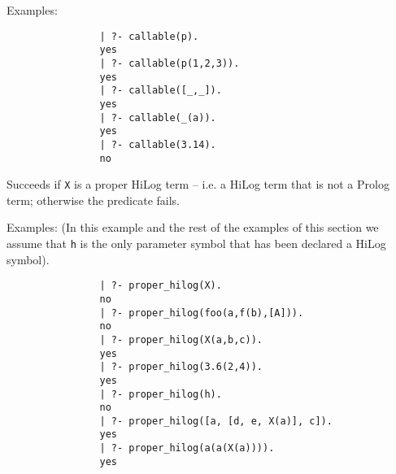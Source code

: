 \begin{description}
    Examples:
    {\footnotesize
     \begin{verbatim}
                | ?- callable(p).
                yes
                | ?- callable(p(1,2,3)).
                yes
                | ?- callable([_,_]).
                yes
                | ?- callable(_(a)).
                yes
                | ?- callable(3.14).
                no
     \end{verbatim}}

%
   Succeeds if {\tt X} is a proper HiLog term -- i.e. a HiLog term
   that is not a Prolog term; otherwise the predicate fails.

    Examples:
    (In this example and the rest of the examples of this section we assume
     that {\tt h} is the only parameter symbol that has been declared a HiLog
     symbol).

    {\footnotesize
     \begin{verbatim}
                | ?- proper_hilog(X).
                no
                | ?- proper_hilog(foo(a,f(b),[A])).
                no
                | ?- proper_hilog(X(a,b,c)).
                yes
                | ?- proper_hilog(3.6(2,4)).
                yes
                | ?- proper_hilog(h).
                no
                | ?- proper_hilog([a, [d, e, X(a)], c]).
                yes
                | ?- proper_hilog(a(a(X(a)))).
                yes
     \end{verbatim}}


\end{description}
